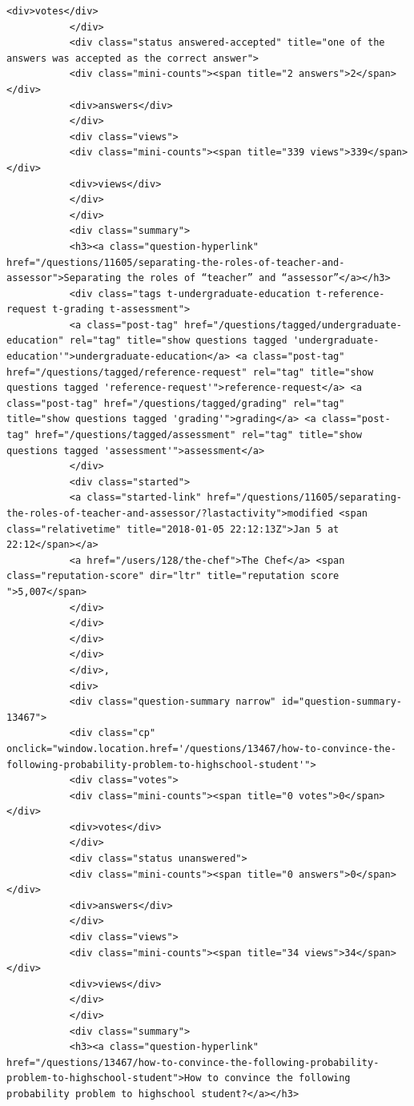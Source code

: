 \documentclass[11pt]{article}
\begin{document}
\begin{Verbatim}[commandchars=\\\{\}]
           <div>votes</div>
           </div>
           <div class="status answered-accepted" title="one of the answers was accepted as the correct answer">
           <div class="mini-counts"><span title="2 answers">2</span></div>
           <div>answers</div>
           </div>
           <div class="views">
           <div class="mini-counts"><span title="339 views">339</span></div>
           <div>views</div>
           </div>
           </div>
           <div class="summary">
           <h3><a class="question-hyperlink" href="/questions/11605/separating-the-roles-of-teacher-and-assessor">Separating the roles of “teacher” and “assessor”</a></h3>
           <div class="tags t-undergraduate-education t-reference-request t-grading t-assessment">
           <a class="post-tag" href="/questions/tagged/undergraduate-education" rel="tag" title="show questions tagged 'undergraduate-education'">undergraduate-education</a> <a class="post-tag" href="/questions/tagged/reference-request" rel="tag" title="show questions tagged 'reference-request'">reference-request</a> <a class="post-tag" href="/questions/tagged/grading" rel="tag" title="show questions tagged 'grading'">grading</a> <a class="post-tag" href="/questions/tagged/assessment" rel="tag" title="show questions tagged 'assessment'">assessment</a>
           </div>
           <div class="started">
           <a class="started-link" href="/questions/11605/separating-the-roles-of-teacher-and-assessor/?lastactivity">modified <span class="relativetime" title="2018-01-05 22:12:13Z">Jan 5 at 22:12</span></a>
           <a href="/users/128/the-chef">The Chef</a> <span class="reputation-score" dir="ltr" title="reputation score ">5,007</span>
           </div>
           </div>
           </div>
           </div>
           </div>,
           <div>
           <div class="question-summary narrow" id="question-summary-13467">
           <div class="cp" onclick="window.location.href='/questions/13467/how-to-convince-the-following-probability-problem-to-highschool-student'">
           <div class="votes">
           <div class="mini-counts"><span title="0 votes">0</span></div>
           <div>votes</div>
           </div>
           <div class="status unanswered">
           <div class="mini-counts"><span title="0 answers">0</span></div>
           <div>answers</div>
           </div>
           <div class="views">
           <div class="mini-counts"><span title="34 views">34</span></div>
           <div>views</div>
           </div>
           </div>
           <div class="summary">
           <h3><a class="question-hyperlink" href="/questions/13467/how-to-convince-the-following-probability-problem-to-highschool-student">How to convince the following probability problem to highschool student?</a></h3>

\end{Verbatim}
\end{document}
